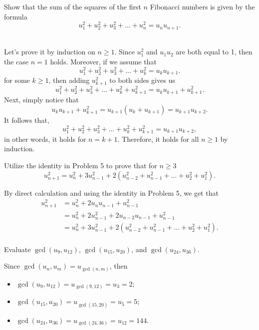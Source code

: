 \begin{exercise}
    Show that the sum of the squares of the first $n$ Fibonacci numbers is given by the formula
    $$u_1^2 + u_2^2 + u_3^2 + \dots + u_n^2 = u_nu_{n+1}.$$
    \\ 
\end{exercise}

\begin{solution}
    Let's prove it by induction on $n \geq 1$. Since $u_1^2$ and $u_1u_2$ are both equal to 1, then the case $n = 1$ holds. Moreover, if we assume that
    $$u_1^2 + u_2^2 + u_3^2 + \dots + u_k^2 = u_ku_{k+1}.$$
    for some $k \geq 1$, then adding $u_{k+1}^2$ to both sides gives us
    $$u_1^2 + u_2^2 + u_3^2 + \dots + u_k^2 + u_{k+1}^2 = u_ku_{k+1} + u_{k+1}^2.$$
    Next, simply notice that
    $$u_ku_{k+1} + u_{k+1}^2 = u_{k+1}(u_k + u_{k+1}) = u_{k+1}u_{k+2}.$$
    It follows that,
    $$u_1^2 + u_2^2 + u_3^2 + \dots + u_k^2 + u_{k+1}^2 = u_{k+1}u_{k+2},$$
    in other words, it holds for $n = k+1$. Therefore, it holds for all $n \geq 1$ by induction. \\
\end{solution}

\begin{exercise}
    Utilize the identity in Problem 5 to prove that for $n \geq 3$
    $$u_{n+1}^2 = u_n^2 + 3u_{n-1}^2 + 2(u_{n-2}^2 + u_{n-1}^2 + \dots + u_2^2 + u_1^2).$$
\end{exercise}

\begin{solution}
    By direct calculation and using the identity in Problem 5, we get that
    \begin{align*}
        u_{n+1}^2 &= u_n^2 + 2u_nu_{n-1} + u_{n-1}^2 \\
        &= u_n^2 + 2u_{n-1}^2 + 2u_{n-2}u_{n-1} + u_{n-1}^2 \\
        &= u_n^2 + 3u_{n-1}^2 + 2(u_{n-2}^2 + u_{n-1}^2 + \dots + u_2^2 + u_1^2).\\
    \end{align*}
\end{solution}

\begin{exercise}
    Evaluate $\gcd(u_9, u_{12})$, $\gcd(u_{15}, u_{20})$, and $\gcd(u_{24}, u_{36})$. \\
\end{exercise}

\begin{solution}
    Since $\gcd(u_n, u_m) = u_{\gcd(n,m)}$, then
    \begin{itemize}
        \item $\gcd(u_9, u_{12}) = u_{\gcd(9, 12)} = u_3 = 2$;
        \item $\gcd(u_{15}, u_{20}) = u_{\gcd(15, 20)} = u_5 = 5$;
        \item $\gcd(u_{24}, u_{36}) = u_{\gcd(24, 36)} = u_{12} = 144$.\\
    \end{itemize}
\end{solution}

